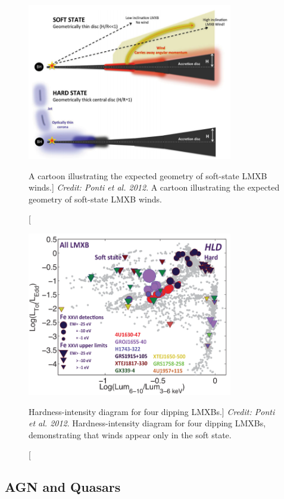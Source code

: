 \begin{figure}
\centering
\includegraphics[width=0.8\textwidth]{figures/01-intro/ponti_wind_cartoon.png}
\caption
[A cartoon illustrating the expected geometry of soft-state LMXB winds.]
{
{\sl Credit: Ponti et al. 2012}. 
A cartoon illustrating the expected geometry of soft-state LMXB winds.
} 
\label{fig:ponti_cartoon}
\end{figure}


\begin{figure}
\centering
\includegraphics[width=0.8\textwidth]{figures/01-intro/ponti_hid.png}
\caption
[Hardness-intensity diagram for four dipping LMXBs.]
{
{\sl Credit: Ponti et al. 2012}. 
Hardness-intensity diagram for four dipping LMXBs,
demonstrating that winds appear only in the soft state.
} 
\label{fig:ponti_hid}
\end{figure}


\subsection{AGN and Quasars}
\label{sec:agn_winds}

